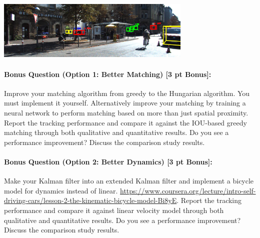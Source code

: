 \documentclass[11pt]{article}
\begin{document}
\begin{center}
    \includegraphics[width=0.7\textwidth]{./fig/Q7_82.jpg}
\end{center}

\paragraph{Bonus Question (Option 1: Better Matching) [3 pt Bonus]:}
Improve your matching algorithm from greedy to the Hungarian algorithm. You must implement it yourself. Alternatively improve your matching by training a neural network to perform matching based on more than just spatial proximity. Report the tracking performance and compare it against the IOU-based greedy matching through both qualitative and quantitative results. Do you see a performance improvement? Discuss the comparison study results.

\paragraph{Bonus Question (Option 2: Better Dynamics) [3 pt Bonus]:}
Make your Kalman filter into an extended Kalman filter and implement a bicycle model for dynamics instead of linear. \url{https://www.coursera.org/lecture/intro-self-driving-cars/lesson-2-the-kinematic-bicycle-model-Bi8yE}. 
Report the tracking performance and compare it against linear velocity model through both qualitative and quantitative results. Do you see a performance improvement?  Discuss the comparison study results.
\end{document}
